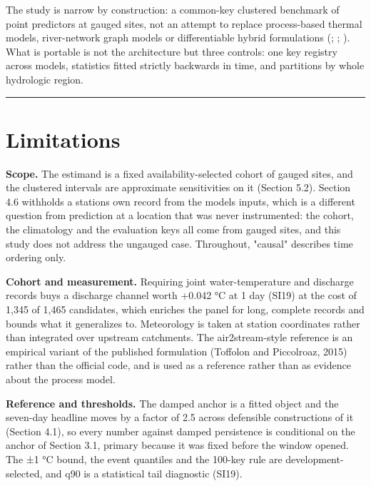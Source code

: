 The study is narrow by construction: a common-key clustered benchmark of point
predictors at gauged sites, not an attempt to replace process-based thermal
models, river-network graph models or differentiable hybrid formulations
(;
;
). What is
portable is not the architecture but three controls: one key registry across
models, statistics fitted strictly backwards in time, and partitions by whole
hydrologic region.

\begin{center}\rule{0.5\linewidth}{0.5pt}\end{center}

\section{Limitations}\label{limitations}

\textbf{Scope.} The estimand is a fixed availability-selected cohort of gauged sites,
and the clustered intervals are approximate sensitivities on it (Section 5.2).
Section 4.6 withholds a station\textquotesingle s own record from the model\textquotesingle s inputs, which is a
different question from prediction at a location that was never instrumented:
the cohort, the climatology and the evaluation keys all come from gauged sites,
and this study does not address the ungauged case. Throughout, "causal"
describes time ordering only.

\textbf{Cohort and measurement.} Requiring joint water-temperature and discharge
records buys a discharge channel worth +0.042 °C at 1 day (SI19) at the cost of
1,345 of 1,465 candidates, which enriches the panel for long, complete records
and bounds what it generalizes to. Meteorology is taken at station coordinates
rather than integrated over upstream catchments. The air2stream-style reference
is an empirical variant of the published formulation (Toffolon and Piccolroaz,
2015) rather than the official code, and is used as a reference rather than as
evidence about the process model.

\textbf{Reference and thresholds.} The damped anchor is a fitted object and the
seven-day headline moves by a factor of 2.5 across defensible constructions of
it (Section 4.1), so every number against damped persistence is conditional on
the anchor of Section 3.1, primary because it was fixed before the window
opened. The ±1 °C bound, the event quantiles and the 100-key rule are
development-selected, and q90 is a statistical tail diagnostic (SI19).

